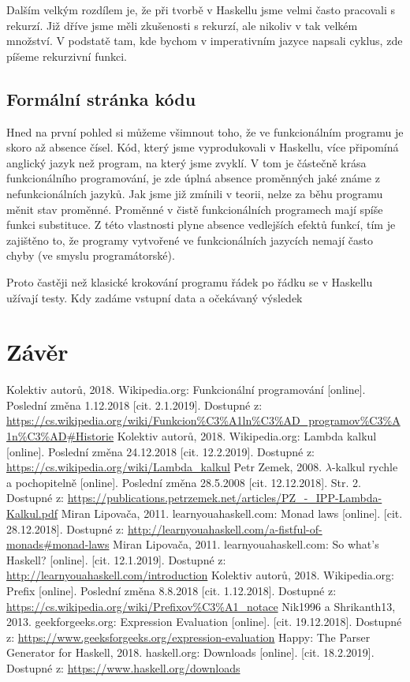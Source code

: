 \documentclass[12pt,a4paper]{report}
\begin{document}
Dalším velkým rozdílem je, že při tvorbě v Haskellu jsme velmi často pracovali s rekurzí. Již dříve jsme měli zkušenosti s rekurzí, ale nikoliv v tak velkém množství. V podstatě tam, kde bychom v imperativním jazyce napsali cyklus, zde píšeme rekurzivní funkci. 

\section{Formální stránka kódu}
Hned na první pohled si můžeme všimnout toho, že ve funkcionálním programu je skoro až absence čísel. Kód, který jsme vyprodukovali v Haskellu, více připomíná anglický jazyk než program, na který jsme zvyklí. V tom je částečně krása funkcionálního programování, je zde úplná absence proměnných jaké známe z nefunkcionálních jazyků. Jak jsme již zmínili v teorii, nelze za běhu programu měnit stav proměnné. Proměnné v čistě funkcionálních programech mají spíše funkci substituce. Z této vlastnosti plyne absence vedlejších efektů funkcí, tím je zajištěno to, že programy vytvořené ve funkcionálních jazycích nemají často chyby (ve smyslu programátorské).

Proto častěji než klasické krokování programu řádek po řádku se v Haskellu užívají testy. Kdy zadáme vstupní data a očekávaný výsledek   
\chapter{Závěr}


\begin{thebibliography}{99}

Kolektiv autorů, 2018. Wikipedia.org: Funkcionální programování [online]. Poslední změna 1.12.2018 [cit. 2.1.2019]. Dostupné z: \url{https://cs.wikipedia.org/wiki/Funkcion%C3%A1ln%C3%AD_programov%C3%A1n%C3%AD#Historie}  
Kolektiv autorů, 2018. Wikipedia.org: Lambda kalkul [online]. Poslední změna 24.12.2018 [cit. 12.2.2019]. Dostupné z: \url{https://cs.wikipedia.org/wiki/Lambda_kalkul}
Petr Zemek, 2008. $\lambda$-kalkul rychle a pochopitelně [online]. Poslední změna 28.5.2008 [cit. 12.12.2018]. Str. 2. Dostupné z: \url{https://publications.petrzemek.net/articles/PZ_-_IPP-Lambda-Kalkul.pdf}
Miran Lipovača, 2011. learnyouahaskell.com: Monad laws [online]. [cit. 28.12.2018]. Dostupné z: \url{http://learnyouahaskell.com/a-fistful-of-monads#monad-laws}
Miran Lipovača, 2011. learnyouahaskell.com: So what's Haskell? [online]. [cit. 12.1.2019]. Dostupné z: \url{http://learnyouahaskell.com/introduction}
Kolektiv autorů, 2018. Wikipedia.org: Prefix [online]. Poslední změna 8.8.2018 [cit. 1.12.2018]. Dostupné z: \url{https://cs.wikipedia.org/wiki/Prefixov%C3%A1_notace}
Nik1996 a Shrikanth13, 2013. geekforgeeks.org: Expression Evaluation [online].  [cit. 19.12.2018]. Dostupné z: \url{https://www.geeksforgeeks.org/expression-evaluation}
Happy: The Parser Generator for Haskell, 2018. haskell.org: Downloads [online].  [cit. 18.2.2019]. Dostupné z: \url{https://www.haskell.org/downloads}
\end{thebibliography}
\end{document}
